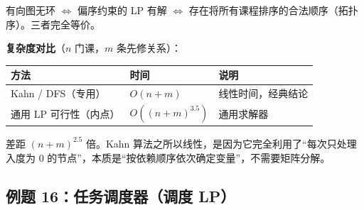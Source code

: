 \documentclass[12pt, a4paper]{ctexart}
\begin{document}
\begin{blackboard}
\begin{keypoint}[无环 = LP 可行 = 存在合法学习顺序]
有向图无环 $\Leftrightarrow$ 偏序约束的 LP 有解 $\Leftrightarrow$ 存在将所有课程排序的合法顺序（拓扑序）。三者完全等价。
\end{keypoint}

\textbf{复杂度对比}（$n$ 门课，$m$ 条先修关系）：

\begin{center}
\begin{tabular}{lll}
\toprule
方法 & 时间 & 说明 \\
\midrule
Kahn / DFS（专用） & $O(n + m)$ & 线性时间，经典结论 \\
通用 LP 可行性（内点） & $O((n+m)^{3.5})$ & 通用求解器 \\
\bottomrule
\end{tabular}
\end{center}

差距 $(n+m)^{2.5}$ 倍。Kahn 算法之所以线性，是因为它完全利用了``每次只处理入度为 0 的节点''，本质是``按依赖顺序依次确定变量''，不需要矩阵分解。

\end{blackboard}

\subsection{例题 16：任务调度器（调度 LP）}
\end{document}
